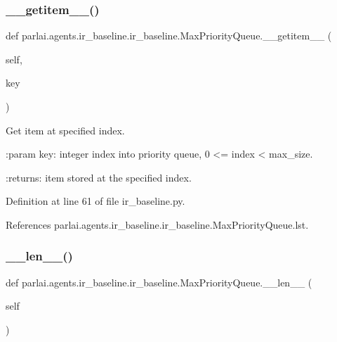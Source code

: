 \subsubsection{\texorpdfstring{\+\_\+\+\_\+getitem\+\_\+\+\_\+()}{\_\_getitem\_\_()}}
{\footnotesize\ttfamily def parlai.\+agents.\+ir\+\_\+baseline.\+ir\+\_\+baseline.\+Max\+Priority\+Queue.\+\_\+\+\_\+getitem\+\_\+\+\_\+ (\begin{DoxyParamCaption}\item[{}]{self,  }\item[{}]{key }\end{DoxyParamCaption})}

\begin{DoxyVerb}Get item at specified index.

:param key: integer index into priority queue, 0 <= index < max_size.

:returns: item stored at the specified index.
\end{DoxyVerb}
 

Definition at line 61 of file ir\+\_\+baseline.\+py.



References parlai.\+agents.\+ir\+\_\+baseline.\+ir\+\_\+baseline.\+Max\+Priority\+Queue.\+lst.

\mbox{\label{classparlai_1_1agents_1_1ir__baseline_1_1ir__baseline_1_1MaxPriorityQueue_a7b1b8f3a2f17a0d4bd3c202bc3bdee78}} 
\subsubsection{\texorpdfstring{\+\_\+\+\_\+len\+\_\+\+\_\+()}{\_\_len\_\_()}}
{\footnotesize\ttfamily def parlai.\+agents.\+ir\+\_\+baseline.\+ir\+\_\+baseline.\+Max\+Priority\+Queue.\+\_\+\+\_\+len\+\_\+\+\_\+ (\begin{DoxyParamCaption}\item[{}]{self }\end{DoxyParamCaption})}

